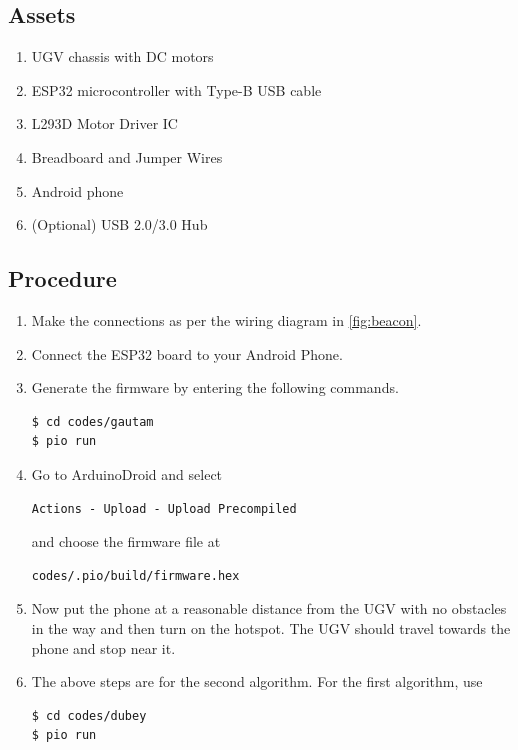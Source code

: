 \documentclass[conference]{IEEEtran}
\begin{document}
\subsection{Assets}
\begin{enumerate}
    \item UGV chassis with DC motors
    \item ESP32 microcontroller with Type-B USB cable
    \item L293D Motor Driver IC
    \item Breadboard and Jumper Wires
    \item Android phone
    \item (Optional) USB 2.0/3.0 Hub
\end{enumerate}

\subsection{Procedure}
\begin{enumerate}
    \item Make the connections as per the wiring diagram in
    \autoref{fig:beacon}.
    \item Connect the ESP32 board to your Android Phone.
    \item Generate the firmware by entering the following commands.
        \begin{lstlisting}
$ cd codes/gautam
$ pio run
        \end{lstlisting}
    \item Go to ArduinoDroid and select
        \begin{lstlisting}
Actions - Upload - Upload Precompiled
        \end{lstlisting}
    and choose the firmware file at
        \begin{lstlisting}
codes/.pio/build/firmware.hex
        \end{lstlisting}
    \item Now put the phone at a reasonable distance from the UGV with no
    obstacles in the way and then turn on the hotspot. The UGV should travel
    towards the phone and stop near it.
\item 
The above steps are for the second algorithm.  For the first algorithm, use 
        \begin{lstlisting}
$ cd codes/dubey
$ pio run
        \end{lstlisting}
\end{enumerate}
\end{document}
